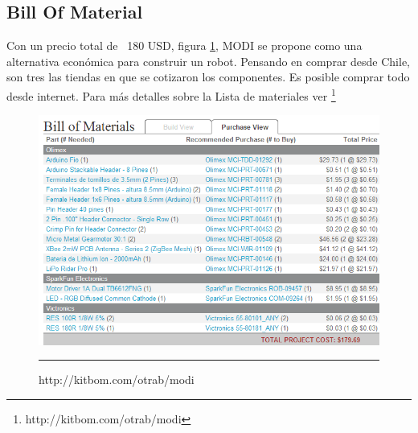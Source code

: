 
\subsection{Bill Of Material}

Con un precio total de ~180 USD, figura \ref{fig:BOM}, MODI se propone como una alternativa económica para construir un robot. Pensando en comprar desde Chile, son tres las tiendas en que se cotizaron los componentes. Es posible comprar todo desde internet. Para más detalles sobre la Lista de materiales ver \footnote{http://kitbom.com/otrab/modi} 
\begin{figure}[htbp]
	\centering
		\includegraphics[width=\textwidth]{./Figures/MODI/kitbom.png}
		\rule{35em}{0.5pt}
	\caption[Bill Of Materials]{http://kitbom.com/otrab/modi}
	\label{fig:BOM}
\end{figure}
